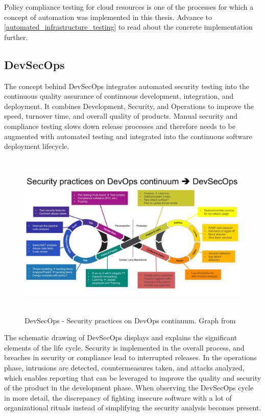 Policy compliance testing for cloud resources is one of the processes for which a concept of automation was implemented in this thesis. Advance to \ref{automated_infrastructure_testing} to read about the concrete implementation further.

\newpage

\subsection{DevSecOps}
The concept behind DevSecOps integrates automated security testing into the continuous quality assurance of continuous development, integration, and deployment. 
It combines Development, Security, and Operations to improve the speed, turnover time, and overall quality of products.
Manual security and compliance testing slows down release processes and therefore needs to be augmented with automated testing and integrated into the continuous software deployment lifecycle.

\begin{figure}[ht!]
\begin{center}
\includegraphics[height=8cm]{devsecops.jpg}
\end{center}
\caption[DevSecOps - Security practices on DevOps continuum]{DevSecOps - Security practices on DevOps continuum. Graph from \citep{alicloud2018}}
\label{fig_devsecops}
\end{figure}

The schematic drawing of DevSecOps displays and explains the significant elements of the life cycle.
Security is implemented in the overall process, and breaches in security or compliance lead to interrupted releases.
In the operations phase, intrusions are detected, countermeasures taken, and attacks analyzed, which enables reporting that can be leveraged to improve the quality and security of the product in the development phase.
When observing the DevSecOps cycle in more detail, the discrepancy of fighting insecure software with a lot of organizational rituals instead of simplifying the security analysis becomes present.

